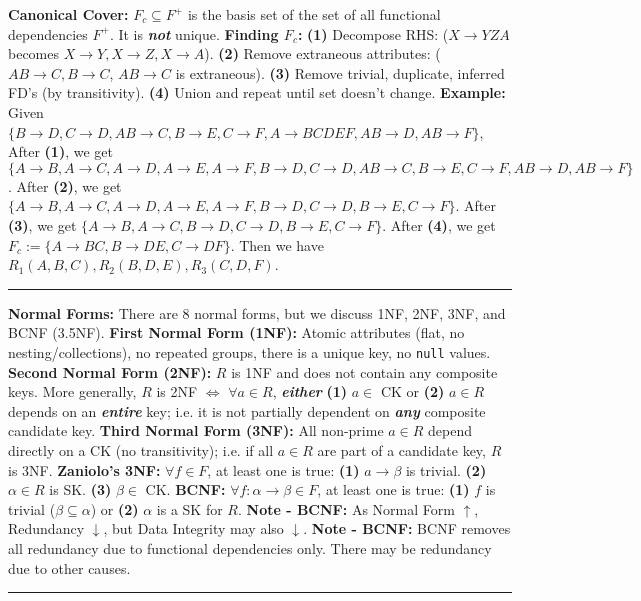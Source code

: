\documentclass{report}
\renewcommand{\bf}[1]{\textbf{{#1}}}
\renewcommand{\tt}[1]{\texttt{{#1}}}
\newcommand{\ib}[1]{\textit{\textbf{{#1}}}}
\begin{document}
\bf{Canonical Cover:} $F_c \subseteq F^+$ is the basis set of the set of all functional dependencies
$F^+$. It is \ib{not} unique.
\hfil \newline
\bf{Finding $F_c$:} 
\bf{(1)} Decompose RHS: ($X \to YZA$ becomes $X \to Y, X \to Z, X \to A$).
\bf{(2)} Remove extraneous attributes: ($AB \to C, B \to C$, $AB \to C$ is extraneous).
\bf{(3)} Remove trivial, duplicate, inferred FD's (by transitivity).
\bf{(4)} Union and repeat until set doesn't change.
\hfil \newline
\bf{Example:} Given $\{B \to D, C \to D, AB \to C, B \to E, C \to F, A \to BCDEF, AB \to D, AB \to
F\}$,
\hfil \newline
After \bf{(1)}, we get $\{A \to B, A \to C, A \to D, A \to E, A \to F, B \to D, C \to D, AB \to C, B
\to E, C \to F, AB \to D, AB \to F\}$. 
\hfil \newline
After \bf{(2)}, we get $\{A \to B, A \to C, A \to D, A \to E, A \to F, B \to D, C \to D, B \to E, C
\to F\}$. 
\hfil \newline
After \bf{(3)}, we get $\{A \to B, A \to C, B \to D, C \to D, B \to E, C \to F\}$.
\hfil \newline
After \bf{(4)}, we get $F_c := \{A \to BC, B \to DE, C \to DF\}$. Then we have $R_1(A, B, C), R_2(B,
D, E), R_3(C, D, F)$.
\hfil \newline
\vspace{-0.8em}
\hrule
\vspace{0.2em}

\bf{Normal Forms:} There are 8 normal forms, but we discuss 1NF, 2NF, 3NF, and BCNF (3.5NF).
\hfil \newline
\bf{First Normal Form (1NF):} Atomic attributes (flat, no nesting/collections), no repeated groups,
there is a unique key, no \tt{null} values.
\hfil \newline
\bf{Second Normal Form (2NF):} $R$ is 1NF and does not contain any composite keys. More generally,
$R$ is 2NF $\iff$ $\forall a \in R$, \ib{either} \bf{(1)} $a \in$ CK or \bf{(2)} $a \in R$ depends 
on an \ib{entire} key; i.e. it is not partially dependent on \ib{any} composite candidate key.
\hfil \newline
\bf{Third Normal Form (3NF):} All non-prime $a \in R$ depend directly on a CK (no transitivity);
i.e. if all $a \in R$ are part of a candidate key, $R$ is 3NF.
\bf{Zaniolo's 3NF:} $\forall f \in F$, at least one is true: \bf{(1)} $a \to \beta$ is trivial.
\bf{(2)} $\alpha \in R$ is SK. \bf{(3)} $\beta \in$ CK.
\hfil \newline
\bf{BCNF:} $\forall f : \alpha \to \beta \in F$, at least one is true: \bf{(1)} $f$ is trivial
($\beta \subseteq \alpha$) or \bf{(2)} $\alpha$ is a SK for $R$.
\hfil \newline
\bf{Note - BCNF:} As Normal Form $\uparrow$, Redundancy $\downarrow$, but Data Integrity may also $\downarrow$.
\hfil \newline
\bf{Note - BCNF:} BCNF removes all redundancy due to functional dependencies only. There may be
redundancy due to other causes.
\hfil \newline
\vspace{-0.8em}
\hrule
\vspace{0.2em}
\end{document}
